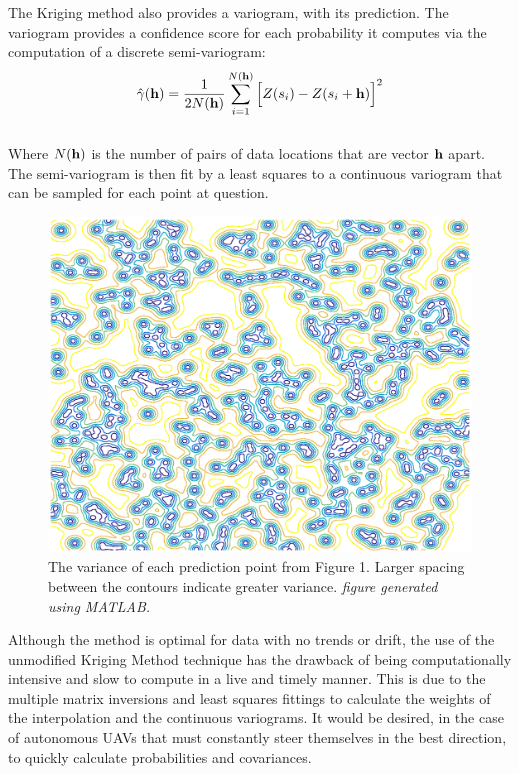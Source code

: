 \documentclass[11pt]{ucthesis}
\begin{document}
The Kriging method also provides a variogram, with its prediction. The variogram provides a confidence score for each probability it computes via the computation of a discrete semi-variogram:\\
\begin{equation}
\hat{\gamma}({\bf{h}})=\dfrac{1}{2N({\bf{h}})}\sum_{i=1}^{N({\bf{h}})}\Big[Z(s_{i})-Z(s_{i}+{\bf{h}})\Big]^{2}
\end{equation}\\
Where $N({\bf{h}})$ is the number of pairs of data locations that are vector ${\bf{h}}$ apart.\\
The semi-variogram is then fit by a least squares to a continuous variogram that can be sampled for each point at question.
\begin{center}
	\begin{figure}[h]
		\centering
		\includegraphics[scale=.5]{kriging_variance.eps}
		\caption{The variance of each prediction point from Figure 1. Larger spacing between the contours indicate greater variance. \textit{figure generated using MATLAB.}}
	\end{figure}
\end{center}
Although the method is optimal for data with no trends or drift, the use of the unmodified Kriging Method technique has the drawback of being computationally intensive and slow to compute in a live and timely manner. This is due to the multiple matrix inversions and least squares fittings to calculate the weights of the interpolation and the continuous variograms. It would be desired, in the case of autonomous UAVs that must constantly steer themselves in the best direction, to quickly calculate probabilities and covariances. \\
\end{document}
